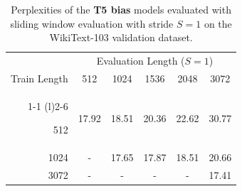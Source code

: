 \begin{table}[t]
\caption{Perplexities of the \textbf{T5 bias} models evaluated with sliding window evaluation with stride $S=1$ on the WikiText-103 validation dataset. }
\label{tab:t5_extrapolating_cw}
\begin{center}

\begin{tabular}{@{}rccccc@{}}
\toprule
                               &  \multicolumn{5}{c}{Evaluation Length ($S=1$)} \\  
               Train Length               & 512 & 1024 & 1536 & 2048 & 3072 \\\cmidrule(r){1-1} \cmidrule(l){2-6}

512&  17.92 & 18.51 & 20.36 & 22.62 & 30.77 \\
 1024 &-& 17.65 & 17.87 & 18.51 & 20.66  \\
3072 & -&- & -& -&  17.41\\ \bottomrule
\end{tabular}

\end{center}
\end{table}


